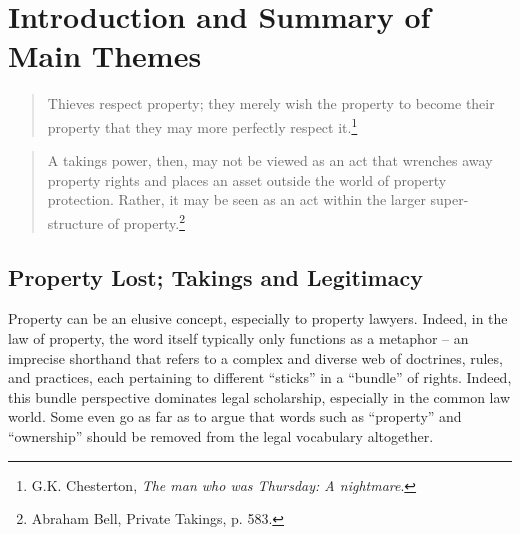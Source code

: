 \chapter{Introduction and Summary of Main Themes}\label{chap:intro}

\begin{quote}
Thieves respect property; they merely wish the property to become their property that they may more perfectly respect it.\footnote{G.K. Chesterton, {\it The man who was Thursday: A nightmare}.}
\end{quote}
\begin{quote}
A takings power, then, may not be viewed as an act that wrenches away property rights and places an asset outside the world of property protection. Rather, it may be seen as an act within the larger super-structure of property.\footnote{Abraham Bell, Private Takings, p. 583.}
\end{quote}
%
%
%
%
\section{Property Lost; Takings and Legitimacy}

Property can be an elusive concept, especially to property lawyers. Indeed, in the law of property, the word itself typically only functions as a metaphor -- an imprecise shorthand that refers to a complex and diverse web of doctrines, rules, and practices, each pertaining to different ``sticks'' in a ``bundle'' of rights. Indeed, this bundle perspective dominates legal scholarship, especially in the common law world. Some even go as far as to argue that words such as ``property'' and ``ownership'' should be removed from the legal vocabulary altogether. 

